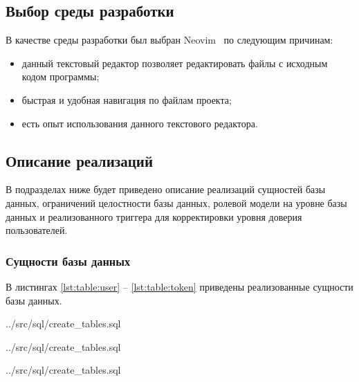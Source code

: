 \subsection*{Выбор среды разработки}

В качестве среды разработки был выбран Neovim~\cite{nvim} по следующим причинам:
\begin{itemize}
    \item данный текстовый редактор позволяет редактировать файлы с исходным кодом программы;
    \item быстрая и удобная навигация по файлам проекта;
    \item есть опыт использования данного текстового редактора.
\end{itemize}

\subsection{Описание реализаций}

В подразделах ниже будет приведено описание реализаций сущностей базы данных, ограничений целостности базы данных, ролевой модели на уровне базы данных и реализованного триггера для корректировки уровня доверия пользователей.

\subsubsection{Сущности базы данных}

В листингах \ref{lst:table:user} -- \ref{lst:table:token} приведены реализованные сущности базы данных.

\begin{code}
    \begin{lstinputlisting}[
            label={lst:table:user},
            caption={Создание User},
            firstline=2,
            lastline=10,
        ]{../src/sql/create_tables.sql}
    \end{lstinputlisting}
\end{code}

\begin{code}
    \begin{lstinputlisting}[
            caption={Создание Document},
            firstline=13,
            lastline=21,
        ]{../src/sql/create_tables.sql}
    \end{lstinputlisting}
\end{code}

\begin{code}
    \begin{lstinputlisting}[
            caption={Создание DocumentAuthor},
            firstline=24,
            lastline=27,
        ]{../src/sql/create_tables.sql}
    \end{lstinputlisting}
\end{code}


